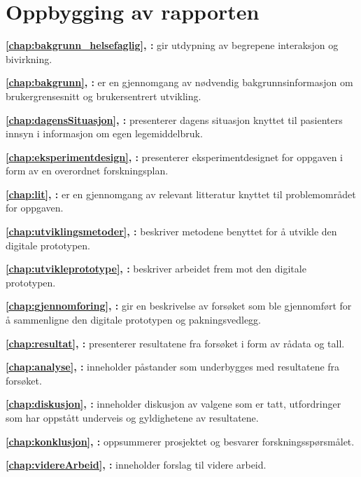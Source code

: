 \section{Oppbygging av rapporten}

\textbf{\autoref{chap:bakgrunn_helsefaglig}, :} gir utdypning av begrepene interaksjon og bivirkning. 

\textbf{\autoref{chap:bakgrunn}, :} er en gjennomgang av nødvendig bakgrunnsinformasjon om brukergrensesnitt og brukersentrert utvikling. 

\textbf{\autoref{chap:dagensSituasjon}, :} presenterer dagens situasjon knyttet til pasienters innsyn i informasjon om egen legemiddelbruk. 

\textbf{\autoref{chap:eksperimentdesign}, :} presenterer eksperimentdesignet for oppgaven i form av en overordnet forskningsplan.

\textbf{\autoref{chap:lit}, :} er en gjennomgang av relevant litteratur knyttet til problemområdet for oppgaven.

\textbf{\autoref{chap:utviklingsmetoder}, :} beskriver metodene benyttet for å utvikle den digitale prototypen.

\textbf{\autoref{chap:utvikleprototype}, :} beskriver arbeidet frem mot den digitale prototypen.

\textbf{\autoref{chap:gjennomforing}, :} gir en beskrivelse av forsøket som ble gjennomført for å sammenligne den digitale prototypen og pakningsvedlegg. 

\textbf{\autoref{chap:resultat}, :} presenterer resultatene fra forsøket i form av rådata og tall.
 
\textbf{\autoref{chap:analyse}, :} inneholder påstander som underbygges med resultatene fra forsøket.

\textbf{\autoref{chap:diskusjon}, :} inneholder diskusjon av valgene som er tatt, utfordringer som har oppstått underveis og gyldighetene av resultatene.

\textbf{\autoref{chap:konklusjon}, :} oppsummerer prosjektet og besvarer forskningsspørsmålet. 

\textbf{\autoref{chap:videreArbeid}, :} inneholder forslag til videre arbeid.
